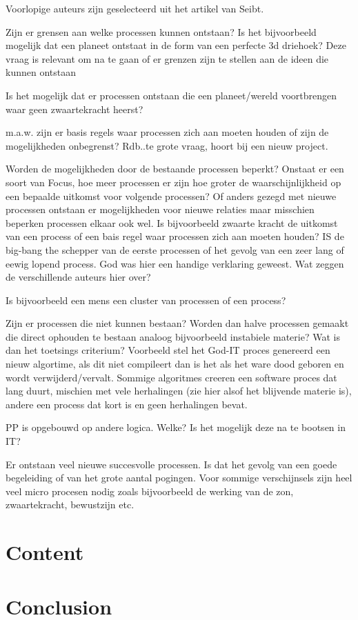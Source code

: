 \documentclass[a4paper]{Thesis}
\begin{document}
Voorlopige auteurs zijn geselecteerd uit het artikel van Seibt.

Zijn er grensen aan welke processen kunnen ontstaan? Is het bijvoorbeeld mogelijk dat een planeet ontstaat in de form van een perfecte 3d driehoek?
Deze vraag is relevant om na te gaan of er grenzen zijn te stellen aan de ideen die kunnen ontstaan

Is het mogelijk dat er processen ontstaan die een planeet/wereld voortbrengen waar geen zwaartekracht heerst?

m.a.w. zijn er basis regels waar processen zich aan moeten houden of zijn de mogelijkheden onbegrenst? 
Rdb..te grote vraag, hoort bij een nieuw project.

Worden de mogelijkheden door de bestaande processen beperkt? Onstaat er een soort van Focus, hoe meer processen er zijn hoe groter de waarschijnlijkheid op een bepaalde uitkomst voor volgende processen? Of anders gezegd met nieuwe processen ontstaan er mogelijkheden voor nieuwe relaties maar misschien beperken processen elkaar ook wel.
Is bijvoorbeeld zwaarte kracht de uitkomst van een process of een bais regel waar processen zich aan moeten houden?
IS de big-bang the schepper van de eerste processen of het gevolg van een zeer lang of eewig lopend process. God was hier een handige verklaring geweest.
Wat zeggen de verschillende auteurs hier over?

Is bijvoorbeeld een mens een cluster van processen of een process?

Zijn er processen die niet kunnen bestaan? Worden dan halve processen gemaakt die direct ophouden te bestaan analoog bijvoorbeeld instabiele materie?
Wat is dan het toetsings criterium? Voorbeeld stel het God-IT proces genereerd een nieuw algortime, als dit niet compileert dan is het als het ware dood geboren en wordt verwijderd/vervalt. Sommige algoritmes creeren een software proces dat lang duurt, mischien met vele herhalingen (zie hier alsof het blijvende materie is), andere een process dat kort is en geen herhalingen bevat.

PP is opgebouwd op andere logica. Welke? Is het mogelijk deze na te bootsen in IT?

Er ontstaan veel nieuwe succesvolle processen. Is dat het gevolg van een goede begeleiding of van het grote aantal pogingen. Voor sommige verschijnsels zijn heel veel micro procesen nodig zoals bijvoorbeeld de werking van de zon, zwaartekracht, bewustzijn etc.


\section{Content}
\section{Conclusion}
\end{document}

